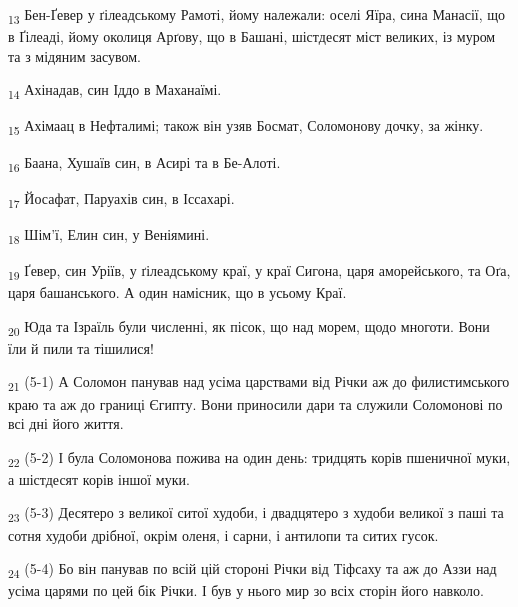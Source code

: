 \begin{tcolorbox}
\textsubscript{13} Бен-Ґевер у ґілеадському Рамоті, йому належали: оселі Яїра, сина Манасії, що в Ґілеаді, йому околиця Арґову, що в Башані, шістдесят міст великих, із муром та з мідяним засувом.
\end{tcolorbox}
\begin{tcolorbox}
\textsubscript{14} Ахінадав, син Іддо в Маханаїмі.
\end{tcolorbox}
\begin{tcolorbox}
\textsubscript{15} Ахімаац в Нефталимі; також він узяв Босмат, Соломонову дочку, за жінку.
\end{tcolorbox}
\begin{tcolorbox}
\textsubscript{16} Баана, Хушаїв син, в Асирі та в Бе-Алоті.
\end{tcolorbox}
\begin{tcolorbox}
\textsubscript{17} Йосафат, Паруахів син, в Іссахарі.
\end{tcolorbox}
\begin{tcolorbox}
\textsubscript{18} Шім'ї, Елин син, у Веніямині.
\end{tcolorbox}
\begin{tcolorbox}
\textsubscript{19} Ґевер, син Уріїв, у ґілеадському краї, у краї Сигона, царя аморейського, та Оґа, царя башанського. А один намісник, що в усьому Краї.
\end{tcolorbox}
\begin{tcolorbox}
\textsubscript{20} Юда та Ізраїль були численні, як пісок, що над морем, щодо многоти. Вони їли й пили та тішилися!
\end{tcolorbox}
\begin{tcolorbox}
\textsubscript{21} (5-1) А Соломон панував над усіма царствами від Річки аж до филистимського краю та аж до границі Єгипту. Вони приносили дари та служили Соломонові по всі дні його життя.
\end{tcolorbox}
\begin{tcolorbox}
\textsubscript{22} (5-2) І була Соломонова пожива на один день: тридцять корів пшеничної муки, а шістдесят корів іншої муки.
\end{tcolorbox}
\begin{tcolorbox}
\textsubscript{23} (5-3) Десятеро з великої ситої худоби, і двадцятеро з худоби великої з паші та сотня худоби дрібної, окрім оленя, і сарни, і антилопи та ситих гусок.
\end{tcolorbox}
\begin{tcolorbox}
\textsubscript{24} (5-4) Бо він панував по всій цій стороні Річки від Тіфсаху та аж до Аззи над усіма царями по цей бік Річки. І був у нього мир зо всіх сторін його навколо.
\end{tcolorbox}

